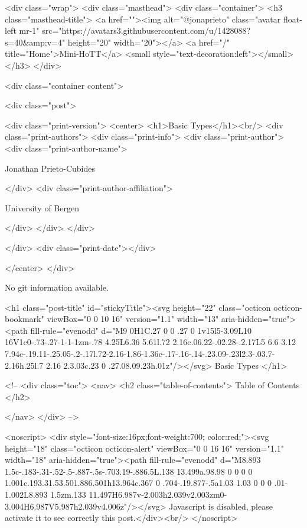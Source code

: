     <div class="wrap">
      <div class="masthead">
        <div class="container">
          <h3 class="masthead-title">
            <a href=""><img alt="@jonaprieto" class="avatar float-left mr-1" src="https://avatars3.githubusercontent.com/u/1428088?s=40&amp;v=4" height="20" width="20"></a>
            <a href="/" title="Home">Mini-HoTT</a>
            <small style="text-decoration:left"></small>
          </h3>
        </div>
      
      <div class="container content">
        







<div class="post">

  <div class="print-version">
    <center>
      <h1>Basic Types</h1><br/>
        <div class="print-authors">
          <div class="print-info">
            <div class="print-author">
              <div class="print-author-name">
                
                  Jonathan Prieto-Cubides
                
              </div>
              <div class="print-author-affiliation">
                
                  University of Bergen
                
                </div>
            </div>
          </div>
          
          
        </div>
        <div class="print-date"></div>
        
        
    </center>
  </div>

  
  No git information available.
  
  <h1 class="post-title" id="stickyTitle"><svg height="22" class="octicon octicon-bookmark" viewBox="0 0 10 16" version="1.1" width="13" aria-hidden="true"><path fill-rule="evenodd" d="M9 0H1C.27 0 0 .27 0 1v15l5-3.09L10 16V1c0-.73-.27-1-1-1zm-.78 4.25L6.36 5.61l.72 2.16c.06.22-.02.28-.2.17L5 6.6 3.12 7.94c-.19.11-.25.05-.2-.17l.72-2.16-1.86-1.36c-.17-.16-.14-.23.09-.23l2.3-.03.7-2.16h.25l.7 2.16 2.3.03c.23 0 .27.08.09.23h.01z"/></svg> Basic Types
  </h1>

  <!-- 
  <div class="toc">
    <nav>
    <h2 class="table-of-contents"> Table of Contents </h2>
      

    </nav>
  </div>
   -->

  <noscript>
  <div style="font-size:16px;font-weight:700; color:red;"><svg height="18" class="octicon octicon-alert" viewBox="0 0 16 16" version="1.1" width="18" aria-hidden="true"><path fill-rule="evenodd" d="M8.893 1.5c-.183-.31-.52-.5-.887-.5s-.703.19-.886.5L.138 13.499a.98.98 0 0 0 0 1.001c.193.31.53.501.886.501h13.964c.367 0 .704-.19.877-.5a1.03 1.03 0 0 0 .01-1.002L8.893 1.5zm.133 11.497H6.987v-2.003h2.039v2.003zm0-3.004H6.987V5.987h2.039v4.006z"/></svg> Javascript is disabled, please activate it to see correctly this post.</div><br/>
  </noscript>

